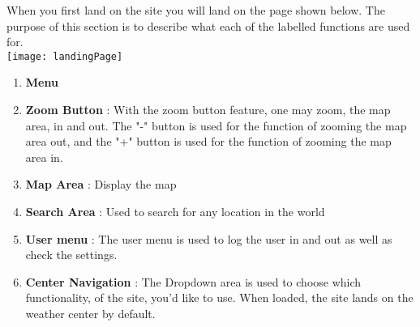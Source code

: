 When you first land on the site you will land on the page shown below. The purpose of this section is to describe what each of the labelled functions are used for. \\[0.5cm]
\texttt{[image: landingPage]} \\[0.5cm]

\begin{enumerate}
	\item \textbf{Menu} 
	\item \textbf{Zoom Button} : With the zoom button feature, one may zoom, the map area, in and out. The "-" button is used for the function of zooming the map area out, and the "+" button is used for the function of zooming the map area in.
	\item \textbf{Map Area} : Display the map
	\item \textbf{Search Area} : Used to search for any location in the world
	\item \textbf{User menu} : The user menu is used to log the user in and out as well as check the settings. 
	\item \textbf{Center Navigation} : The Dropdown area is used to choose which functionality, of the site, you'd like to use. When loaded, the site lands on the weather center by default.
\end{enumerate}
